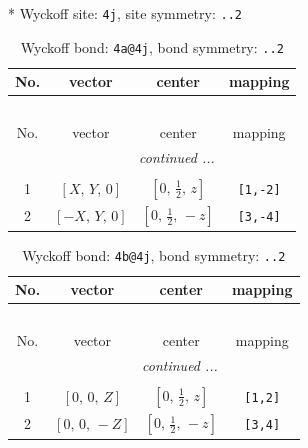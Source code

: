 \documentclass[fleqn,8pt]{jsarticle}
\begin{document}
* Wyckoff site: {\tt 4j}, site symmetry: {\tt ..2}
\renewcommand{\arraystretch}{1.2}
\begin{longtable}{cccc}
\caption{Wyckoff bond: {\tt 4a@4j}, bond symmetry: {\tt ..2}}
 \\
 \hline \hline
No. & vector & center & mapping \\ \hline \endfirsthead

\multicolumn{3}{l}{\tablename\ \thetable{}} \\
 \hline \hline
No. & vector & center & mapping \\ \hline \endhead

 \hline \hline
\multicolumn{3}{r}{\footnotesize\it continued ...} \\ \endfoot

 \hline \hline
\multicolumn{3}{r}{} \\ \endlastfoot

1 & $\left[ X,\, Y,\, 0 \right]$ & $\left[ 0,\, \frac{1}{2},\, z \right]$ & {\tt [1,-2]} \\ \hline
2 & $\left[ - X,\, Y,\, 0 \right]$ & $\left[ 0,\, \frac{1}{2},\, - z \right]$ & {\tt [3,-4]} \\
\end{longtable}
\renewcommand{\arraystretch}{1.2}
\begin{longtable}{cccc}
\caption{Wyckoff bond: {\tt 4b@4j}, bond symmetry: {\tt ..2}}
 \\
 \hline \hline
No. & vector & center & mapping \\ \hline \endfirsthead

\multicolumn{3}{l}{\tablename\ \thetable{}} \\
 \hline \hline
No. & vector & center & mapping \\ \hline \endhead

 \hline \hline
\multicolumn{3}{r}{\footnotesize\it continued ...} \\ \endfoot

 \hline \hline
\multicolumn{3}{r}{} \\ \endlastfoot

1 & $\left[ 0,\, 0,\, Z \right]$ & $\left[ 0,\, \frac{1}{2},\, z \right]$ & {\tt [1,2]} \\ \hline
2 & $\left[ 0,\, 0,\, - Z \right]$ & $\left[ 0,\, \frac{1}{2},\, - z \right]$ & {\tt [3,4]} \\
\end{longtable}
\renewcommand{\arraystretch}{1.2}
\end{document}
